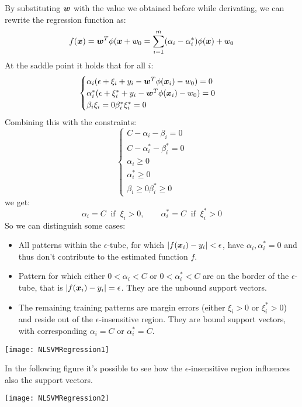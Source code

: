 By substituting $\bm{w}$ with the value we obtained before while derivating, we can rewrite the regression function as:
\[f(\bm{x})=\bm{w}^T\phi(\bm{x}+w_0=\displaystyle\sum_{i=1}^m(\alpha_i-\alpha_i^*)\phi(\bm{x})+w_0\]
At the saddle point it holds that for all $i$:
\[
  \begin{cases}
    \alpha_i(\epsilon+\xi_i+y_i-\bm{w}^T\phi(\bm{x}_i)-w_0)=0\\
    \alpha_i^*(\epsilon+\xi_i^*+y_i-\bm{w}^T\phi(\bm{x}_i)-w_0)=0\\
    \beta_i\xi_i=0
    \beta_i^*\xi_i^*=0
  \end{cases}
\]
Combining this with the constraints:
\[
\begin{cases}
  C-\alpha_i-\beta_i=0\\
  C-\alpha_i^*-\beta_i^*=0\\
  \alpha_i\geq 0\\
  \alpha_i^*\geq 0\\
  \beta_i\geq 0
  \beta_i^*\geq 0
\end{cases}
\]
we get:
\[\alpha_i=C~\text{ if }~\xi_i>0,\qquad\alpha_i^*=C~\text{ if }~\xi_i^*>0\]
So we can distinguish some cases:
\begin{itemize}
  \item All patterns within the $\epsilon$-tube, for which $\vert f(\bm{x}_i)-y_i\vert<\epsilon$, have $\alpha_i,\alpha_i^*=0$ and thus don't contribute to the estimated function $f$.
  \item Pattern for which either $0<\alpha_i<C$ or $0<\alpha_i^*<C$ are on the border of the $\epsilon$-tube, that is $\vert f(\bm{x}_i)-y_i\vert=\epsilon$. They are the unbound support vectors.
  \item The remaining training patterns are margin errors (either $\xi_i>0$ or $\xi_i^*>0$) and reside out of the $\epsilon$-insensitive region. They are bound support vectors, with corresponding $\alpha_i=C$ or $\alpha_i^*=C$.
\end{itemize}
\begin{center}
  \texttt{[image: NLSVMRegression1]}
\end{center}
In the following figure it's possible to see how the $\epsilon$-insensitive region influences also the support vectors.
\begin{center}
  \texttt{[image: NLSVMRegression2]}
\end{center}



